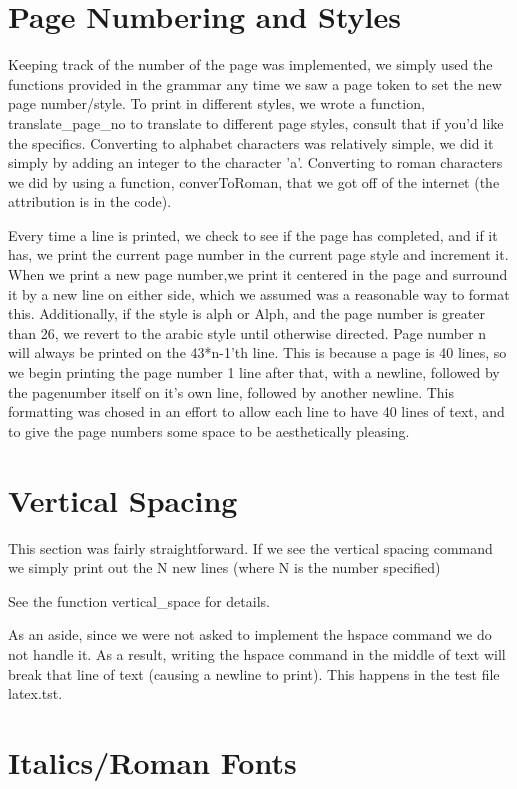 \section{Page Numbering and Styles}

Keeping track of the number of the page was implemented, we simply used the functions provided in the grammar any time we saw a page token to set the new page number/style. To print in different styles, we wrote a function, translate_page_no to translate to different page styles, consult that if you'd like the specifics. Converting to alphabet characters was relatively simple, we did it simply by adding an integer to the character 'a'. Converting to roman characters we did by using a function, converToRoman, that we got off of the internet (the attribution is in the code). 

Every time a line is printed, we check to see if the page has completed, and if it has, we print the current page number in the current page style and increment it. When we print a new page number,we print it centered in the page and surround it by a new line on either side, which we assumed was a reasonable way to format this. Additionally, if the style is alph or Alph, and the page number is greater than 26, we revert to the arabic style until otherwise directed. Page number n will always be printed on the 43*n-1'th line. This is because a page is 40 lines, so we begin printing the page number 1 line after that, with a newline, followed by the pagenumber itself on it's own line, followed by another newline. This formatting was chosed in an effort to allow each line to have 40 lines of text, and to give the page numbers some space to be aesthetically pleasing. 


\section{Vertical Spacing}

This section was fairly straightforward. If we see the vertical spacing command we
simply print out the N new lines (where N is the number specified) 

See the function vertical_space for details.

As an aside, since we were not asked to implement the hspace command we do not handle
it. As a result, writing the hspace command in the middle of text will break that line
of text (causing a newline to print). This happens in the test file latex.tst.

\section{Italics/Roman Fonts}

